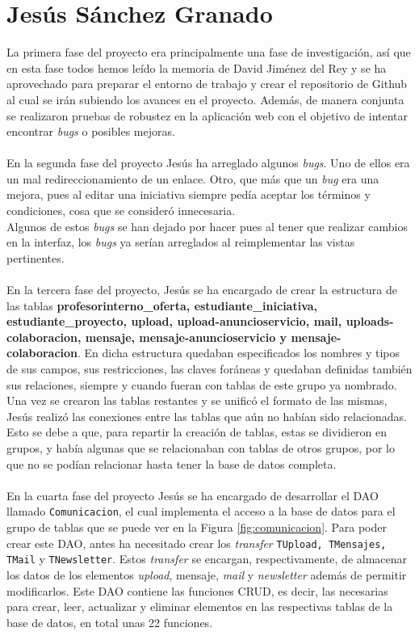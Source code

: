 \documentclass[11pt]{book}
\begin{document}
	\section{Jesús Sánchez Granado}
	La primera fase del proyecto era principalmente una fase de investigación, así que en esta fase todos hemos leído la memoria de David Jiménez del Rey y se ha aprovechado para preparar el entorno de trabajo y crear el repositorio de Github al cual se irán subiendo los avances en el proyecto. Además, de manera conjunta se realizaron pruebas de robustez en la aplicación web con el objetivo de intentar encontrar \emph{bugs} o posibles mejoras.\\\\
	En la segunda fase del proyecto Jesús ha arreglado algunos \emph{bugs}. Uno de ellos era un mal redireccionamiento de un enlace. Otro, que más que un \emph{bug} era una mejora, pues al editar una iniciativa siempre pedía aceptar los términos y condiciones, cosa que se consideró innecesaria.\\
	Algunos de estos \emph{bugs} se han dejado por hacer pues al tener que realizar cambios en la interfaz, los \emph{bugs} ya serían arreglados al reimplementar las vistas pertinentes.\\\\
	En la tercera fase del proyecto, Jesús se ha encargado de crear la estructura de las tablas \textbf{profesorinterno\_oferta, estudiante\_iniciativa, estudiante\_proyecto, upload, upload-anuncioservicio, mail, uploads-colaboracion, mensaje, mensaje-anuncioservicio y mensaje-colaboracion}. En dicha estructura quedaban especificados los nombres y tipos de sus campos, sus restricciones, las claves foráneas y quedaban definidas también sus relaciones, siempre y cuando fueran con tablas de este grupo ya nombrado.\\
	Una vez se crearon las tablas restantes y se unificó el formato de las mismas, Jesús realizó las conexiones entre las tablas que aún no habían sido relacionadas. Esto se debe a que, para repartir la creación de tablas, estas se dividieron en grupos, y había algunas que se relacionaban con tablas de otros grupos, por lo que no se podían relacionar hasta tener la base de datos completa.\\\\
	En la cuarta fase del proyecto Jesús se ha encargado de desarrollar el DAO llamado \texttt{Comunicacion}, el cual implementa el acceso a la base de datos para el grupo de tablas que se puede ver en la Figura \ref{fig:comunicacion}. Para poder crear este DAO, antes ha necesitado crear los \emph{transfer} \texttt{TUpload, TMensajes, TMail} y \texttt{TNewsletter}. Estos \emph{transfer} se encargan, respectivamente, de almacenar los datos de los elementos \textit{upload}, mensaje, \textit{mail} y \textit{newsletter} además de permitir modificarlos. Este DAO contiene las funciones CRUD, es decir, las necesarias para crear, leer, actualizar y eliminar elementos en las respectivas tablas de la base de datos, en total unas 22 funciones. \\
\end{document}
